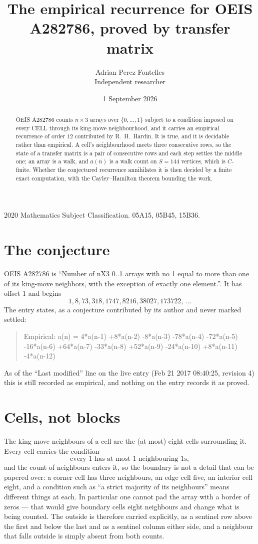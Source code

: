\documentclass[11pt,a4paper]{article}
\title{The empirical recurrence for OEIS A282786, proved by transfer matrix}
\author{Adrian Perez Fontelles\\ \small Independent researcher}
\date{1 September 2026}
\theoremstyle{plain}
\theoremstyle{definition}
\begin{document}
\maketitle

\begin{abstract}
OEIS A282786 counts $n\times3$ arrays over $\{0,\dots,1\}$ subject to a condition imposed on
every CELL through its king-move neighbourhood, and it carries an empirical recurrence of
order $12$ contributed by R.~H.~Hardin. It is true, and it is decidable rather than
empirical. A cell's neighbourhood meets three consecutive rows, so the state of a transfer
matrix is a pair of consecutive rows and each step settles the middle one; an array is a
walk, and $a(n)$ is a walk count on $S=144$ vertices, which is $C$-finite. Whether the
conjectured recurrence annihilates it is then decided by a finite exact computation, with the
Cayley--Hamilton theorem bounding the work.
\end{abstract}

\noindent\small 2020 Mathematics Subject Classification. 05A15, 05B45, 15B36.\normalsize

\section{The conjecture}

OEIS A282786 is ``Number of nX3 0..1 arrays with no 1 equal to more than one of its king-move neighbors, with the exception of exactly one element.''. It has offset $1$ and begins
\[
1, 8, 73, 318, 1747, 8216, 38027, 173722,\ \dots
\]
The entry states, as a conjecture contributed by its author and never marked settled:
\begin{quote}
Empirical: a(n) = 4*a(n-1) +8*a(n-2) -8*a(n-3) -78*a(n-4) -72*a(n-5) -16*a(n-6) +64*a(n-7) -33*a(n-8) +52*a(n-9) -24*a(n-10) +8*a(n-11) -4*a(n-12)
\end{quote}
As of the ``Last modified'' line on the live entry (Feb 21 2017 08:40:25, revision 4) this is still
recorded as empirical, and nothing on the entry records it as proved.

\section{Cells, not blocks}

The king-move neighbours of a cell are the (at most) eight cells surrounding it. Every cell
carries the condition
\[
\text{every }1\text{ has at most }1\text{ neighbouring }1\text{s},
\]
and the count of neighbours enters it, so the boundary is not a detail that can be papered
over: a corner cell has three neighbours, an edge cell five, an interior cell eight, and a
condition such as ``a strict majority of its neighbours'' means different things at each. In
particular one cannot pad the array with a border of zeros --- that would give boundary cells
eight neighbours and change what is being counted. The outside is therefore carried
explicitly, as a sentinel row above the first and below the last and as a sentinel column
either side, and a neighbour that falls outside is simply absent from both counts.
\end{document}
